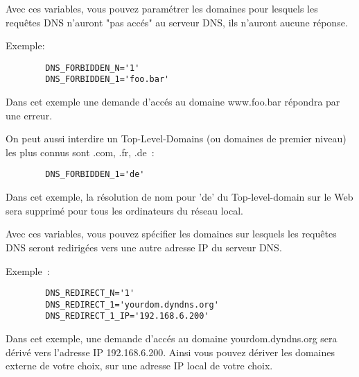 \begin{description}

    {Avec ces variables, vous pouvez paramétrer les domaines pour lesquels les
    requêtes DNS n'auront "pas accés" au serveur DNS, ils n'auront aucune réponse.

      Exemple:

\begin{example}
\begin{verbatim}
        DNS_FORBIDDEN_N='1'
        DNS_FORBIDDEN_1='foo.bar'
\end{verbatim}
\end{example}

      Dans cet exemple une demande d'accés au domaine www.foo.bar répondra
      par une erreur.

      On peut aussi interdire un Top-Level-Domains (ou domaines de premier niveau)
      les plus connus sont .com, .fr, .de~:

\begin{example}
\begin{verbatim}
        DNS_FORBIDDEN_1='de'
\end{verbatim}
\end{example}

      Dans cet exemple, la résolution de nom pour 'de' du Top-level-domain sur
      le Web sera supprimé pour tous les ordinateurs du réseau local.}


    {Avec ces variables, vous pouvez spécifier les domaines sur lesquels les
    requêtes DNS seront redirigées vers une autre adresse IP du serveur DNS.

      Exemple~:

\begin{example}
\begin{verbatim}
        DNS_REDIRECT_N='1'
        DNS_REDIRECT_1='yourdom.dyndns.org'
        DNS_REDIRECT_1_IP='192.168.6.200'
\end{verbatim}
\end{example}

      Dans cet exemple, une demande d'accés au domaine yourdom.dyndns.org sera
      dérivé vers l'adresse IP 192.168.6.200. Ainsi vous pouvez dériver les
      domaines externe de votre choix, sur une adresse IP local de votre choix.}


\end{description}
